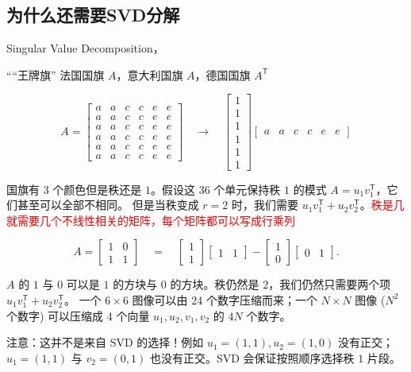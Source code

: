 \subsection{为什么还需要SVD分解}
Singular Value Decomposition，
\begin{example}[2]
``“王牌旗'' 法国国旗 $A$，意大利国旗 $A$，德国国旗 $A^{\mathsf T}$

\[
A =
\begin{bmatrix}
a & a & c & c & e & e\\
a & a & c & c & e & e\\
a & a & c & c & e & e\\
a & a & c & c & e & e\\
a & a & c & c & e & e\\
a & a & c & c & e & e
\end{bmatrix}
\quad\longrightarrow\quad
\begin{bmatrix}
1\\1\\1\\1\\1\\1
\end{bmatrix}
\begin{bmatrix}
a & a & c & c & e & e
\end{bmatrix}
\]

国旗有 3 个颜色但是秩还是 $1$。假设这 36 个单元保持秩 $1$ 的模式 $A = u_1 v_1^{\mathsf T}$，它们甚至可以全部不相同。
但是当秩变成 $r=2$ 时，我们需要 $u_1 v_1^{\mathsf T} + u_2 v_2^{\mathsf T}$。\textcolor{red}{秩是几就需要几个不线性相关的矩阵，每个矩阵都可以写成行乘列}
\end{example}

\begin{example}[3 嵌入方形]
\[
A=
\begin{bmatrix}
1 & 0\\
1 & 1
\end{bmatrix}
\quad=\quad
\begin{bmatrix}
1\\1
\end{bmatrix}
\begin{bmatrix}
1 & 1
\end{bmatrix}
-
\begin{bmatrix}
1\\0
\end{bmatrix}
\begin{bmatrix}
0 & 1
\end{bmatrix}.
\]

$A$ 的 $1$ 与 $0$ 可以是 $1$ 的方块与 $0$ 的方块。秩仍然是 $2$，我们仍然只需要两个项 $u_1 v_1^{\mathsf T}+u_2 v_2^{\mathsf T}$。
一个 $6\times 6$ 图像可以由 24 个数字压缩而来；一个 $N\times N$ 图像 ($N^2$ 个数字) 可以压缩成 4 个向量 $u_1,u_2,v_1,v_2$ 的 $4N$ 个数字。

注意：这并不是来自 SVD 的选择！例如 $u_1=(1,1), u_2=(1,0)$ 没有正交；
$u_1=(1,1)$ 与 $v_2=(0,1)$ 也没有正交。SVD 会保证按照顺序选择秩 $1$ 片段。
\end{example}


